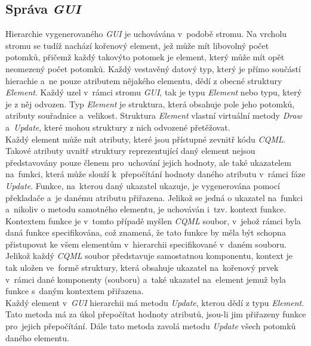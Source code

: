\documentclass[11pt,twoside,a4paper]{book}
\begin{document}
\subsection {Správa \textit{GUI}}
Hierarchie vygenerovaného \textit{GUI} je uchovávána v~podobě stromu. Na vrcholu stromu se tudíž nachází kořenový element, jež může mít libovolný počet potomků, přičemž každý takovýto potomek je element, který může mít opět neomezený počet potomků. Každý vestavěný datový typ, který je přímo součástí hierachie a~ne pouze atributem nějakého elementu, dědí z obecné struktury \textit{Element}. Každý uzel v~rámci stromu \textit{GUI}, tak je typu \textit{Element} nebo typu, který je z něj odvozen. Typ \textit{Element} je struktura, která obsahuje pole jeho potomků, atributy souřadnice a~velikost. Struktura \textit{Element} vlastní virtuální metody \textit{Draw} a~\textit{Update}, které mohou struktury z nich odvozené přetěžovat.\\
Každý element může mít atributy, které jsou přístupné zevnitř kódu \textit{CQML}. Takové atributy uvnitř struktury reprezentující daný element nejsou představovány pouze členem pro~uchování jejich hodnoty, ale také ukazatelem na~funkci, která může slouží k~přepočítání hodnoty daného atributu v~rámci fáze \textit{Update}. Funkce, na~kterou daný ukazatel ukazuje, je vygenerována pomocí překladače a~je danému atributu přiřazena. Jelikož se jedná o ukazatel na~funkci a~nikoliv o metodu samotného elementu, je uchováván i~tzv. kontext funkce. Kontextem funkce je v~tomto případě myšlen \textit{CQML} soubor, v~jehož rámci byla daná funkce specifikována, což znamená, že tato funkce by měla být schopna přistupovat ke všem elementům v~hierarchii specifikované v~daném souboru. Jelikož každý \textit{CQML} soubor představuje samostatnou komponentu, kontext je tak uložen ve~formě struktury, která obsahuje ukazatel na~kořenový prvek v~rámci dané komponenty (souboru) a~také ukazatel na~element jemuž byla funkce s~daným kontextem přiřazena.\\
Každý element v~\textit{GUI} hierarchii má metodu \textit{Update}, kterou dědí z typu \textit{Element}. Tato metoda má za úkol přepočítat hodnoty atributů, jsou-li jim přiřazeny funkce pro~jejich přepočítání. Dále tato metoda zavolá metodu \textit{Update} všech potomků daného elementu.
\end{document}

